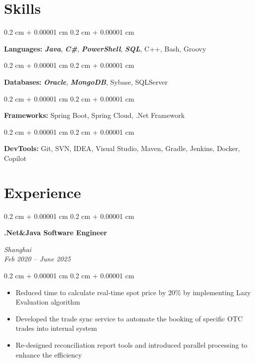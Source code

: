 \documentclass[10pt, letterpaper]{article}
\newenvironment{highlights}{
	\begin{itemize}[
		topsep=0.10 cm,
		parsep=0.10 cm,
		partopsep=0pt,
		itemsep=0pt,
		leftmargin=0.4 cm + 10pt
		]
	}{
	\end{itemize}
} %
\newenvironment{onecolentry}{
	\begin{adjustwidth}{
			0.2 cm + 0.00001 cm
		}{
			0.2 cm + 0.00001 cm
		}
	}{
	\end{adjustwidth}
} %
\newenvironment{twocolentry}[2][]{
	\onecolentry
	\def\secondColumn{#2}
	\setcolumnwidth{\fill, 4.5 cm}
	\begin{paracol}{2}
	}{
		\switchcolumn \raggedleft \secondColumn
	\end{paracol}
	\endonecolentry
} %
\begin{document}
	
	\section{Skills}
	\vspace{0.1 cm}
		
		\begin{onecolentry}
			\textbf{Languages:} \emph{\textbf{Java}}, \emph{\textbf{C\#}}, \emph{\textbf{PowerShell}}, \emph{\textbf{SQL}}, C++, Bash, Groovy
		\end{onecolentry}
		
		\vspace{0.1 cm}
		
		\begin{onecolentry}
			\textbf{Databases:} \emph{\textbf{Oracle}}, \emph{\textbf{MongoDB}}, Sybase,  SQLServer
		\end{onecolentry}
		
		\vspace{0.1 cm}
		
		\begin{onecolentry}
			\textbf{Frameworks:} Spring Boot, Spring Cloud, .Net Framework
		\end{onecolentry}
		
		\vspace{0.1 cm}
		
		\begin{onecolentry}
			\textbf{DevTools:} Git, SVN, IDEA, Visual Studio, Maven, Gradle, Jenkins, Docker, Copilot
		\end{onecolentry}
	
	
	
	
	\section{Experience}
	\vspace{0.1 cm}
	
	\begin{twocolentry}{
		\textit{Shanghai} \\
		\textit{Feb 2020 – June 2025}}
		\textbf{.Net\&Java Software Engineer}
		\\
	\end{twocolentry}
	
	\vspace{0.08 cm}
	\begin{onecolentry}
		\begin{highlights}
			\item Reduced time to calculate real-time spot price by 20\% by implementing Lazy Evaluation algorithm
			\item Developed the trade sync service to automate the booking of specific OTC trades into internal system
			\item Re-designed reconciliation report tools and introduced parallel processing to enhance the efficiency
		\end{highlights}
	\end{onecolentry}
	
\end{document}
